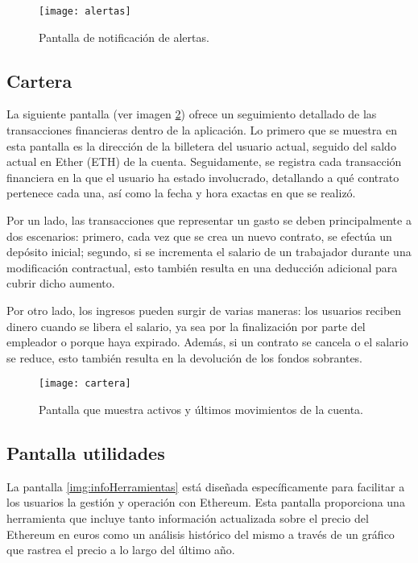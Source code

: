\begin{figure}[h]
	\label{img:alertas}
	\centering
	\texttt{[image: alertas]}
	\caption[Pantalla alertas]{Pantalla de notificación de alertas.}
\end{figure}



\subsection{Cartera}

La siguiente pantalla (ver imagen \ref{img:cartera}) ofrece un seguimiento detallado de las transacciones financieras dentro de la aplicación.
Lo primero que se muestra en esta pantalla es la dirección de la billetera del usuario actual, seguido del saldo actual en Ether (ETH) de la cuenta.
Seguidamente, se registra cada transacción financiera en la que el usuario ha estado involucrado, detallando a qué contrato pertenece cada una, así como la fecha y hora exactas en que se realizó.

Por un lado, las transacciones que representar un gasto se deben principalmente a dos escenarios: primero, cada vez que se crea un nuevo contrato, se efectúa un depósito inicial; segundo, si se incrementa el salario de un trabajador durante una modificación contractual, esto también resulta en una deducción adicional para cubrir dicho aumento.

Por otro lado, los ingresos pueden surgir de varias maneras: los usuarios reciben dinero cuando se libera el salario, ya sea por la finalización por parte del empleador o porque haya expirado. Además, si un contrato se cancela o el salario se reduce, esto también resulta en la devolución de los fondos sobrantes.

\begin{figure}[h]
	\label{img:cartera}
	\centering
	\texttt{[image: cartera]}
	\caption[Pantalla cartera]{Pantalla que muestra activos y últimos movimientos de la cuenta.}
\end{figure}



\subsection{Pantalla utilidades}

La pantalla \ref{img:infoHerramientas} está diseñada específicamente para facilitar a los usuarios la gestión y operación con Ethereum.
Esta pantalla proporciona una herramienta que incluye tanto información actualizada sobre el precio del Ethereum en euros como un análisis histórico del mismo a través de un gráfico que rastrea el precio a lo largo del último año.

